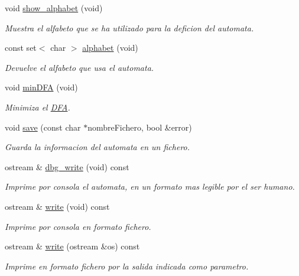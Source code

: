 \begin{DoxyCompactItemize}
\mbox{\label{class_d_f_a_a3f03ba04e1130dafc0a62a101ecec61a}} 
void \hyperlink{class_d_f_a_a3f03ba04e1130dafc0a62a101ecec61a}{show\+\_\+alphabet} (void)
\begin{DoxyCompactList}\small\item\em Muestra el alfabeto que se ha utilizado para la deficion del automata. \end{DoxyCompactList}\item 
const set$<$ char $>$ \hyperlink{class_d_f_a_a0884e79fd0a48a42e49fe7854a19628d}{alphabet} (void)
\begin{DoxyCompactList}\small\item\em Devuelve el alfabeto que usa el automata. \end{DoxyCompactList}\item 
\mbox{\label{class_d_f_a_ab17185eaa4d96f9822bab514372abdd9}} 
void \hyperlink{class_d_f_a_ab17185eaa4d96f9822bab514372abdd9}{min\+D\+FA} (void)
\begin{DoxyCompactList}\small\item\em Minimiza el \hyperlink{class_d_f_a}{D\+FA}. \end{DoxyCompactList}\item 
void \hyperlink{class_d_f_a_ac614efadfde86fde0b0ab45f2c9c2e5e}{save} (const char $\ast$nombre\+Fichero, bool \&error)
\begin{DoxyCompactList}\small\item\em Guarda la informacion del automata en un fichero. \end{DoxyCompactList}\item 
ostream \& \hyperlink{class_d_f_a_ac7f9b36f9c298f1dfd53c4bdf395c1d5}{dbg\+\_\+write} (void) const
\begin{DoxyCompactList}\small\item\em Imprime por consola el automata, en un formato mas legible por el ser humano. \end{DoxyCompactList}\item 
ostream \& \hyperlink{class_d_f_a_a453bbd313adb90e3615694aad833b014}{write} (void) const
\begin{DoxyCompactList}\small\item\em Imprime por consola en formato fichero. \end{DoxyCompactList}\item 
ostream \& \hyperlink{class_d_f_a_aec27d0774ad67c7c29a5679e938fab5d}{write} (ostream \&os) const
\begin{DoxyCompactList}\small\item\em Imprime en formato fichero por la salida indicada como parametro. \end{DoxyCompactList}\item 

\end{DoxyCompactItemize}
